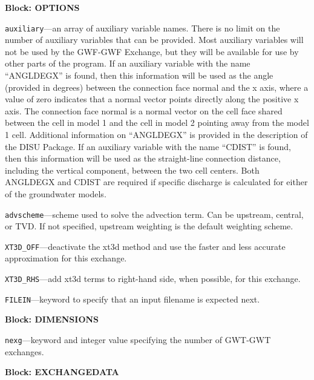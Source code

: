 
\item \textbf{Block: OPTIONS}

\begin{description}
\item \texttt{auxiliary}---an array of auxiliary variable names.  There is no limit on the number of auxiliary variables that can be provided. Most auxiliary variables will not be used by the GWF-GWF Exchange, but they will be available for use by other parts of the program.  If an auxiliary variable with the name ``ANGLDEGX'' is found, then this information will be used as the angle (provided in degrees) between the connection face normal and the x axis, where a value of zero indicates that a normal vector points directly along the positive x axis.  The connection face normal is a normal vector on the cell face shared between the cell in model 1 and the cell in model 2 pointing away from the model 1 cell.  Additional information on ``ANGLDEGX'' is provided in the description of the DISU Package.  If an auxiliary variable with the name ``CDIST'' is found, then this information will be used as the straight-line connection distance, including the vertical component, between the two cell centers.  Both ANGLDEGX and CDIST are required if specific discharge is calculated for either of the groundwater models.

\item \texttt{advscheme}---scheme used to solve the advection term.  Can be upstream, central, or TVD.  If not specified, upstream weighting is the default weighting scheme.

\item \texttt{XT3D\_OFF}---deactivate the xt3d method and use the faster and less accurate approximation for this exchange.

\item \texttt{XT3D\_RHS}---add xt3d terms to right-hand side, when possible, for this exchange.

\item \texttt{FILEIN}---keyword to specify that an input filename is expected next.

\end{description}
\item \textbf{Block: DIMENSIONS}

\begin{description}
\item \texttt{nexg}---keyword and integer value specifying the number of GWT-GWT exchanges.

\end{description}
\item \textbf{Block: EXCHANGEDATA}

